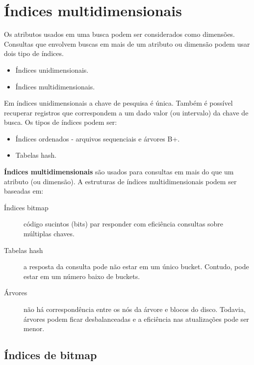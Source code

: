 \section{Índices multidimensionais}

Os atributos usados em uma busca podem ser considerados como dimensões.
Consultas que envolvem buscas em mais de um atributo ou dimensão podem
usar dois tipo de índices.
\begin{itemize}
\item Índices unidimensionais.
\item Índices multidimensionais.
\end{itemize}

Em índices unidimensionais a chave de pesquisa é única. Também é possível
recuperar registros que correspondem a um dado valor (ou intervalo)
da chave de busca. Os tipos de índices podem ser:
\begin{itemize}
\item Índices ordenados - arquivos sequenciais e árvores B+.
\item Tabelas hash.
\end{itemize}

\textbf{Índices multidimensionais} são usados para consultas em mais do que um atributo
(ou dimensão).
A estruturas de índices multidimensionais podem ser baseadas em:
\begin{description}
\item[Índices bitmap] código sucintos (bits) par responder com eficiência 
consultas sobre múltiplas chaves.

\item[Tabelas hash] a resposta da consulta pode não estar em um único bucket.
Contudo, pode estar em um número baixo de buckets.

\item[Árvores] não há correspondência entre os nós da árvore e blocos do disco.
Todavia, árvores podem ficar desbalanceadas e a eficiência nas atualizações
pode ser menor.
\end{description}

\subsection{Índices de bitmap}

